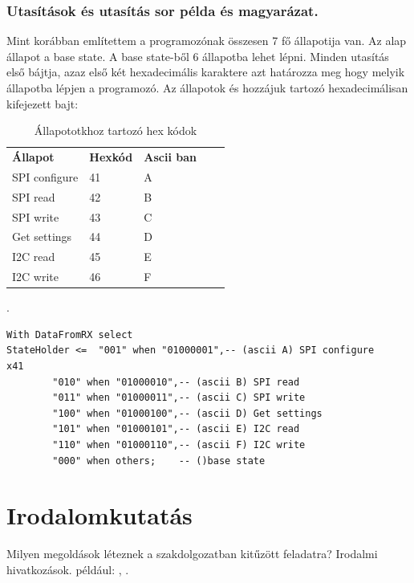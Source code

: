 \documentclass[a4paper,12pt,oneside]{book}
\begin{document}
\subsection{Utasítások és utasítás sor példa és magyarázat.}
Mint korábban említettem a programozónak összesen 7 fő állapotija van. Az alap állapot a base state. A base state-ből 6 állapotba lehet lépni. 
Minden utasítás első bájtja, azaz első két hexadecimális karaktere azt határozza meg hogy melyik állapotba lépjen a programozó.
Az állapotok és hozzájuk tartozó hexadecimálisan kifejezett bajt:
\begin{table}[H]
\centering 
\begin{tabular}{lllll}
\textbf{Állapot}                      & \textbf{Hexkód}            & \textbf{Ascii ban}        &  &  \\
\cellcolor[HTML]{D9D9D9}SPI configure & \cellcolor[HTML]{D9D9D9}41 & \cellcolor[HTML]{D9D9D9}A &  &  \\
SPI read                              & 42                         & B                         &  &  \\
\cellcolor[HTML]{D9D9D9}SPI write     & \cellcolor[HTML]{D9D9D9}43 & \cellcolor[HTML]{D9D9D9}C &  &  \\
Get settings                          & 44                         & D                         &  &  \\
\cellcolor[HTML]{D9D9D9}I2C read      & \cellcolor[HTML]{D9D9D9}45 & \cellcolor[HTML]{D9D9D9}E &  &  \\
I2C write                             & 46                         & F                         &  & 
\end{tabular}
\caption{Állapototkhoz tartozó hex kódok}.
\label{Állapototkhoz tartozó hex kódok} 
\end{table}


\iffalse
\begin{lstlisting}
With DataFromRX select
StateHolder <= 	"001" when "01000001",-- (ascii A) SPI configure	x41 
		"010" when "01000010",-- (ascii B) SPI read
		"011" when "01000011",-- (ascii C) SPI write
		"100" when "01000100",-- (ascii D) Get settings
		"101" when "01000101",-- (ascii E) I2C read
		"110" when "01000110",-- (ascii F) I2C write
		"000" when others;    -- ()base state
	\end{lstlisting}







\chapter{Irodalomkutatás}
Milyen megoldások léteznek a szakdolgozatban kitűzött feladatra? Irodalmi hivatkozások. például: \cite{b1}, \cite{htm}.
\end{document}
